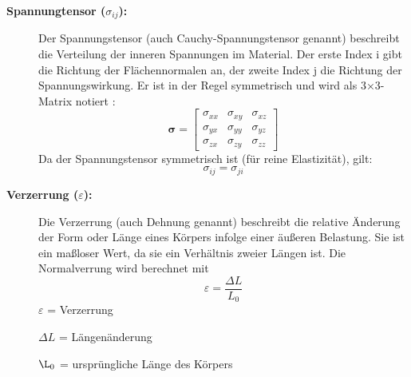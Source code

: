\begin{description}
	\item[\textbf{Spannungtensor ($\sigma_{ij}$):}] Der Spannungstensor (auch Cauchy-Spannungstensor genannt) beschreibt die Verteilung der inneren Spannungen im Material. 
	Der erste Index	i gibt die Richtung der Flächennormalen an, der zweite Index j die Richtung der Spannungswirkung. 
	Er ist in der Regel symmetrisch und wird als 3×3-Matrix notiert \cite{elastomechanik:Grundlagen der Elastizitaetstheorie}:
	\begin{equation}
	\boldsymbol{\sigma} =
	\begin{bmatrix}
		\sigma_{xx} & \sigma_{xy} & \sigma_{xz} \\
		\sigma_{yx} & \sigma_{yy} & \sigma_{yz} \\
		\sigma_{zx} & \sigma_{zy} & \sigma_{zz}
	\end{bmatrix}
	\end{equation}
	Da der Spannungstensor symmetrisch ist (für reine Elastizität), gilt:
	\begin{equation}
		\sigma_{ij} = 
		\sigma_{ji}
	\end{equation}
	\item[\textbf{Verzerrung ($\varepsilon$):}] Die Verzerrung (auch Dehnung genannt) beschreibt die relative Änderung der Form oder Länge eines Körpers infolge einer äußeren Belastung. 
	Sie ist ein maßloser Wert, da sie ein Verhältnis zweier Längen ist.
	Die Normalverrung wird berechnet mit
	\begin{equation}
		\varepsilon 
		= \frac{\Delta L}{L_0}
	\end{equation}
	$\varepsilon$ = Verzerrung
	
	$\Delta L$ = Längenänderung
	
	$\L_0$ = ursprüngliche Länge des Körpers
	

\end{description}
